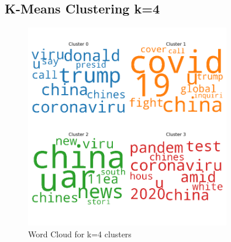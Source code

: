 \begin{appendices}
	\section{K-Means Clustering k=4}
	\label{k4}
	\begin{figure}[H]
		\centering
		\includegraphics[width=0.8\textwidth]{images/kmeans_word_cloud_k=4.png}
		\caption{Word Cloud for k=4 clusters}
		\label{fig:wck4}
	\end{figure}
	

\end{appendices}
